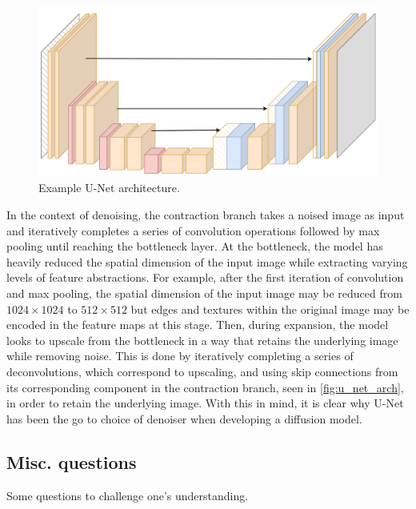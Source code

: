 \documentclass[11pt]{article}
\begin{document}
\begin{figure}[ht]
    \centering
    \includegraphics[width=\columnwidth]{./figures/generative_models/unet.png}
    \caption{\centering Example U-Net architecture.}
    \label{fig:u_net_arch}
\end{figure}

\noindent In the context of denoising, the contraction branch takes a noised image as input and iteratively completes a series of convolution operations followed by max pooling until reaching the bottleneck layer. At the bottleneck, the model has heavily reduced the spatial dimension of the input image while extracting varying levels of feature abstractions. For example, after the first iteration of convolution and max pooling, the spatial dimension of the input image may be reduced from $1024\times1024$ to $512\times512$ but edges and textures within the original image may be encoded in the feature maps at this stage. Then, during expansion, the model looks to upscale from the bottleneck in a way that retains the underlying image while removing noise. This is done by iteratively completing a series of deconvolutions, which correspond to upscaling, and using skip connections from its corresponding component in the contraction branch, seen in \autoref{fig:u_net_arch}, in order to retain the underlying image. With this in mind, it is clear why U-Net has been the go to choice of denoiser when developing a diffusion model.

\subsection{Misc. questions}

Some questions to challenge one's understanding.
\end{document}
